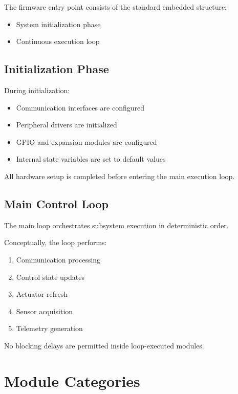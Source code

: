The firmware entry point consists of the standard embedded structure:

\begin{itemize}
	\item System initialization phase
	\item Continuous execution loop
\end{itemize}

\subsection{Initialization Phase}

During initialization:

\begin{itemize}
	\item Communication interfaces are configured
	\item Peripheral drivers are initialized
	\item GPIO and expansion modules are configured
	\item Internal state variables are set to default values
\end{itemize}

All hardware setup is completed before entering the main execution loop.

\subsection{Main Control Loop}

The main loop orchestrates subsystem execution in deterministic order.

Conceptually, the loop performs:

\begin{enumerate}
	\item Communication processing
	\item Control state updates
	\item Actuator refresh
	\item Sensor acquisition
	\item Telemetry generation
\end{enumerate}

No blocking delays are permitted inside loop-executed modules.


\section{Module Categories}


